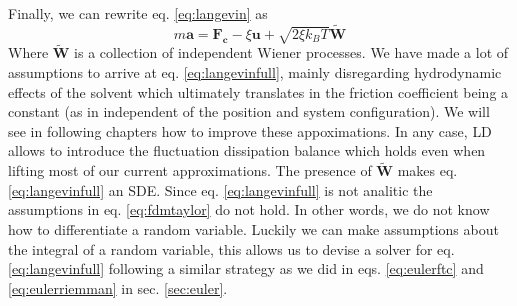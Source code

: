 \documentclass[ twoside,openright,titlepage,numbers=noenddot,%
headinclude,footinclude,cleardoublepage=empty,abstract=on,
BCOR=5mm,paper=a4,fontsize=11pt, dvipsnames
]{scrreprt}
\renewcommand{\vec}[1]{\bm{#1}}
\newcommand{\pvel}{u}
\begin{document}
Finally, we can rewrite eq. \eqref{eq:langevin} as
%
%
\begin{equation}
  \label{eq:langevinfull}
  m\vec{a} = \vec{F_c} - \xi \vec{\pvel} + \sqrt{2\xi k_BT}\vec{\widetilde{W}}
\end{equation}
Where $\vec{\widetilde{W}}$ is a collection of independent Wiener processes.
We have made a lot of assumptions to arrive at eq. \eqref{eq:langevinfull}, mainly disregarding hydrodynamic effects of the solvent which ultimately translates in the friction coefficient being a constant (as in independent of the position and system configuration). We will see in following chapters how to improve these appoximations. In any case, \gls{LD} allows to introduce the fluctuation dissipation balance which holds even when lifting most of our current approximations.
The presence of $\vec{\widetilde{W}}$ makes eq. \eqref{eq:langevinfull} an \gls{SDE}. Since eq. \eqref{eq:langevinfull} is not analitic the assumptions in eq. \eqref{eq:fdmtaylor} do not hold. In other words, we do not know how to differentiate a random variable. Luckily we can make assumptions about the integral of a random variable, this allows us to devise a solver for eq. \eqref{eq:langevinfull} following a similar strategy as we did in eqs. \eqref{eq:eulerftc} and \eqref{eq:eulerriemman} in sec. \ref{sec:euler}.
\end{document}
